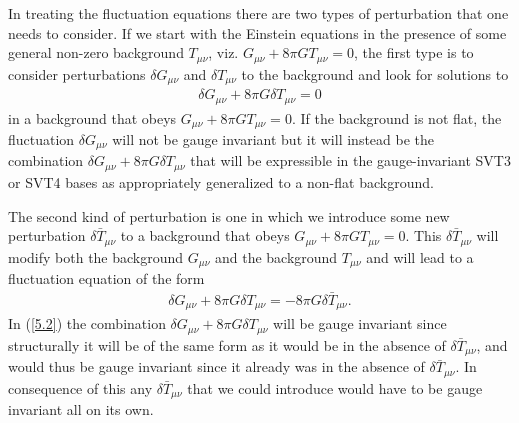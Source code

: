 In treating the fluctuation equations there are two types of perturbation that one needs to consider. If we start with the Einstein equations in the presence of some general non-zero background $T_{\mu\nu}$, viz. $G_{\mu\nu}+8\pi G T_{\mu\nu}=0$, the first type is to consider perturbations $\delta G_{\mu\nu}$ and $\delta T_{\mu\nu}$ to the background and look for solutions to  
%
\begin{eqnarray}
\delta G_{\mu\nu}+8\pi G \delta T_{\mu\nu}=0
\label{5.1}
\end{eqnarray}
%
in a background that obeys $G_{\mu\nu}+8\pi G T_{\mu\nu}=0$. If the background is not flat, the fluctuation $\delta G_{\mu\nu}$ will not be gauge invariant  but it will instead be the combination $\delta G_{\mu\nu}+8\pi G \delta T_{\mu\nu}$  that will be expressible in the gauge-invariant SVT3 or SVT4 bases as appropriately generalized to a non-flat background.

The second kind of perturbation is one in which we introduce some new perturbation $\delta \bar{T}_{\mu\nu}$ to a background that obeys $G_{\mu\nu}+8\pi G T_{\mu\nu}=0$. This $\delta \bar{T}_{\mu\nu}$ will modify both the background $G_{\mu\nu}$ and the background $T_{\mu\nu}$ and will lead to a fluctuation equation of the form 
%
\begin{eqnarray}
\delta G_{\mu\nu}+8\pi G \delta T_{\mu\nu}=-8 \pi G \delta \bar{T}_{\mu\nu}. 
\label{5.2}
\end{eqnarray}
%
In (\ref{5.2}) the combination $\delta G_{\mu\nu}+8\pi G \delta T_{\mu\nu}$ will be gauge invariant since structurally it will be of the same form as it would be in the absence of $\delta \bar{T}_{\mu\nu}$, and would thus be gauge invariant since it already was in the absence of $\delta \bar{T}_{\mu\nu}$. In consequence of this any $\delta \bar{T}_{\mu\nu}$ that we could introduce would have to be gauge invariant all on its own.

